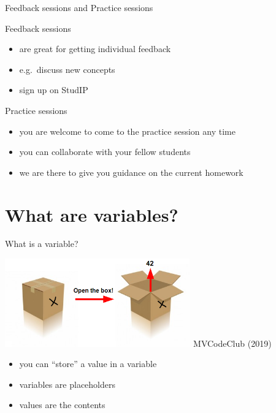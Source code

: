 \documentclass[
  american,
  ignorenonframetext,
]{beamer}
\providecommand{\tightlist}{%
  \setlength{\itemsep}{0pt}\setlength{\parskip}{0pt}}
\begin{document}
\begin{frame}{Feedback sessions and Practice sessions}
\protect\hypertarget{feedback-sessions-and-practice-sessions}{}

\begin{block}{Feedback sessions}

\begin{itemize}
\tightlist
\item
  are great for getting individual feedback
\item
  e.g.~discuss new concepts
\item
  sign up on StudIP
\end{itemize}

\end{block}

\begin{block}{Practice sessions}

\begin{itemize}
\tightlist
\item
  you are welcome to come to the practice session any time
\item
  you can collaborate with your fellow students
\item
  we are there to give you guidance on the current homework
\end{itemize}

\end{block}

\end{frame}

\hypertarget{what-are-variables}{%
\section{What are variables?}\label{what-are-variables}}

\begin{frame}{What is a variable?}
\protect\hypertarget{what-is-a-variable}{}

\includegraphics[width=0.6\textwidth,height=\textheight]{02_Variables_Assignments/var_box.png}
MVCodeClub (2019)

\begin{itemize}
\tightlist
\item
  you can ``store'' a value in a variable
\item
  variables are placeholders
\item
  values are the contents
\end{itemize}


\end{frame}
\end{document}
